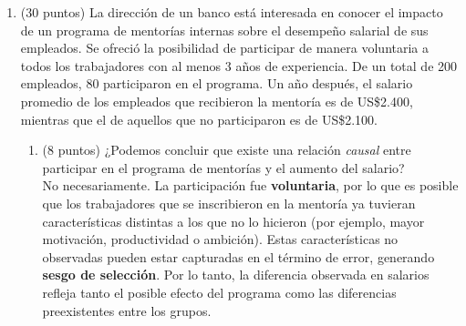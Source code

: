 \documentclass[10pt,a4paper]{article}
\begin{document}
\begin{enumerate}
\begin{itemize}
            Sin considerar habilidad, ¿cuál sería el coeficiente estimado para $\beta$? Y si se incluye habilidad, cómo debería ser el coeficiente estimado para $\beta$?\\
            
            \textbf{Respuesta:} De los datos se obtiene que:

            $$\hat{\beta} = \frac{cov(S^P_i, S_i)}{var(S^P_i)}=\frac{31,05}{37,2} \approx 0,84$$

            Además, si se incluye la habilidad lo más probable es que el estimador esté sesgado hacia arriba por lo que se esperaría que la nueva medición arrojara un coeficiente menor al encontrado anteriormente. De hecho, este se puede justificar con que habilidad con escolaridad correlacionan positivo ($\gamma >0$). Por otro lado, se esperaría que la relación entre habilidad y escolaridad de los padres fuese positiva, lo que de hecho se calcula como
            $$cov(S^P_i, H_i) \approx 11,5$$
            Por lo tanto, el sesgo de la estimación sería positivo.
        \end{itemize}

        \item (30 puntos) La dirección de un banco está interesada en conocer el impacto de un programa de mentorías internas sobre el desempeño salarial de sus empleados. 
Se ofreció la posibilidad de participar de manera voluntaria a todos los trabajadores con al menos 3 años de experiencia. 
De un total de 200 empleados, 80 participaron en el programa. 
Un año después, el salario promedio de los empleados que recibieron la mentoría es de US\$2.400, mientras que el de aquellos que no participaron es de US\$2.100.

\begin{enumerate}
    \item (8 puntos) ¿Podemos concluir que existe una relación \textit{causal} entre participar en el programa de mentorías y el aumento del salario? 
    \\[0.25cm]
   {\color{blue} No necesariamente. La participación fue \textbf{voluntaria}, por lo que es posible que los trabajadores que se inscribieron en la mentoría ya tuvieran características distintas a los que no lo hicieron 
    (por ejemplo, mayor motivación, productividad o ambición). 
    Estas características no observadas pueden estar capturadas en el término de error, generando \textbf{sesgo de selección}. 
    Por lo tanto, la diferencia observada en salarios refleja tanto el posible efecto del programa como las diferencias preexistentes entre los grupos.}


\end{enumerate}
\end{enumerate}
\end{document}
